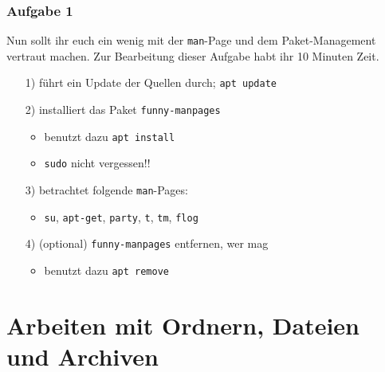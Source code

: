\documentclass[12pt,utf8]{beamer}
\begin{document}
\begin{frame}
\frametitle{Aufgabe 1}
Nun sollt ihr euch ein wenig mit der \texttt{man}-Page und dem Paket-Management vertraut machen. Zur Bearbeitung dieser Aufgabe habt ihr 10 Minuten Zeit.
\begin{itemize}
	\item[1)] führt ein Update der Quellen durch; \texttt{apt update}
	\item[2)] installiert das Paket \texttt{funny-manpages}
	\begin{itemize}
		\item benutzt dazu \texttt{apt install}
		\item \texttt{sudo} nicht vergessen!!
	\end{itemize}
	\item[3)] betrachtet folgende \texttt{man}-Pages:
	\begin{itemize}
		\item \texttt{su}, \texttt{apt-get}, \texttt{party}, \texttt{t}, \texttt{tm}, \texttt{flog}
	\end{itemize}
	\item[4)] (optional) \texttt{funny-manpages} entfernen, wer mag
	\begin{itemize}
		\item benutzt dazu \texttt{apt remove}
	\end{itemize}
\end{itemize} 
\end{frame}

\section{Arbeiten mit Ordnern, Dateien und Archiven}
\end{document}
